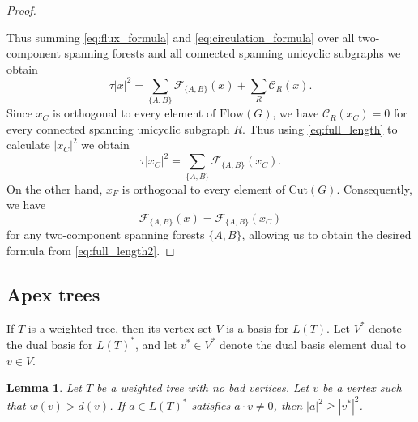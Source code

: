 \documentclass[11pt]{amsart}
\newtheorem{lem}[thm]{Lemma}
\numberwithin{equation}{section}
\def\cC{{\mathcal C}}
\def\cF{{\mathcal F}}
\def\Cut{{\mathrm{Cut}}}
\def\Flow{{\mathrm{Flow}}}
\def\Cut{{\mathrm{Cut}}}
\def\Flow{{\mathrm{Flow}}}
\newcommand{\norm}[1]{\left| #1 \right|^2}
\begin{document}
\begin{proof}
\begin{itemize}
\end{itemize}
 Thus summing \eqref{eq:flux_formula} and \eqref{eq:circulation_formula} over all two-component spanning forests and all connected spanning unicyclic subgraphs we obtain
\begin{equation}\label{eq:full_length}
\tau \norm{x}=\sum_{\{A,B\}}\mathcal{F}_{\{A,B\}}(x) + \sum_{R}\mathcal{C}_{R}(x).
\end{equation}
Since $x_C$ is orthogonal to every element of $\Flow(G)$, we have $\cC_R(x_C)=0$ for every connected spanning unicyclic subgraph $R$. Thus using \eqref{eq:full_length} to calculate $\norm{x_C}$ we obtain
\begin{equation}\label{eq:full_length2}
\tau \norm{x_C}=\sum_{\{A,B\}}\mathcal{F}_{\{A,B\}}(x_C).
\end{equation}
On the other hand, $x_F$ is orthogonal to every element of $\Cut(G)$. Consequently, we have
\[
\cF_{\{A,B\}}(x)=\cF_{\{A,B\}}(x_C)
\]
for any two-component spanning forests $\{A,B\}$, allowing us to obtain the desired formula from \eqref{eq:full_length2}.
\end{proof}


\subsection{Apex trees}

If $T$ is a weighted tree, then its vertex set $V$ is a basis for $L(T)$.
Let $V^*$ denote the dual basis for $L(T)^*$, and let $v^* \in V^*$ denote the dual basis element dual to $v \in V$.

\begin{lem}\label{lem:apex_tree}
    Let $T$ be a weighted tree with no bad vertices. Let $v$ be a vertex such that $w(v)>d(v)$. If $a\in L(T)^*$ satisfies $a\cdot v\neq 0$, then $\norm{a} \geq \norm{v^*}$.
\end{lem}
\end{document}
